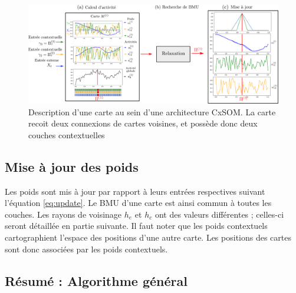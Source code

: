 \begin{figure}
\centering
\includegraphics[width=\textwidth]{map_2layers.pdf}
\caption{Description d'une carte au sein d'une architecture CxSOM. La carte recoit deux connexions de cartes voisines, et possède donc deux couches contextuelles}
\label{fig:one_map}
\end{figure}

\subsection{Mise à jour des poids}

Les poids sont mis à jour par rapport à leurs entrées respectives suivant l'équation \ref{eq:update}. Le BMU d'une carte est ainsi commun à toutes les couches. Les rayons de voisinage $h_e$ et $h_c$ ont des valeurs différentes ; celles-ci seront détaillée en partie suivante. 
Il faut noter que les poids contextuels cartographient l'espace des positions d'une autre carte. Les positions des cartes sont donc associées par les poids contextuels.

\subsection{Résumé : Algorithme général}

